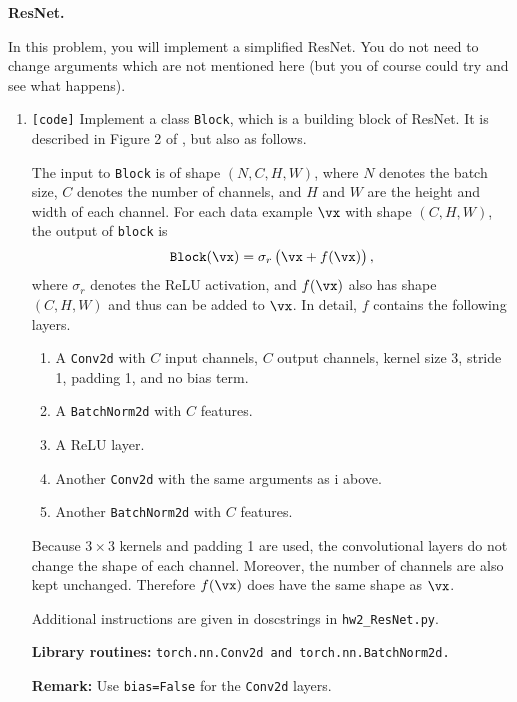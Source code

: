 \begin{Q}
    \textbf{\Large ResNet.}
    
    In this problem, you will implement a simplified ResNet. You do not need to change arguments which are not mentioned here (but you of course could try and see what happens).
    \begin{enumerate}
        \item \texttt{[code]} Implement a class \texttt{Block}, which is a building block of ResNet. It is described in Figure 2 of \citet{resnet}, but also as follows.

        The input to \texttt{Block} is of shape $(N,C,H,W)$, where $N$ denotes the batch size, $C$ denotes the number of channels, and $H$ and $W$ are the height and width of each channel. For each data example $\vx$ with shape $(C,H,W)$, the output of \texttt{block} is
        \begin{align*}%
            \texttt{Block}(\vx)=\sigma_r\del{\vx+f(\vx)},
        \end{align*}
        where $\sigma_r$ denotes the ReLU activation, and $f(\vx)$ also has shape $(C,H,W)$ and thus can be added to $\vx$. In detail, $f$ contains the following layers.
        \begin{enumerate}
            \item A \texttt{Conv2d} with $C$ input channels, $C$ output channels, kernel size 3, stride 1, padding 1, and no bias term.
            \item A \texttt{BatchNorm2d} with $C$ features.
            \item A ReLU layer.
            \item Another \texttt{Conv2d} with the same arguments as i above.
            \item Another \texttt{BatchNorm2d} with $C$ features.
        \end{enumerate}
        Because $3\times3$ kernels and padding 1 are used, the convolutional layers do not change the shape of each channel. Moreover, the number of channels are also kept unchanged. Therefore $f(\vx)$ does have the same shape as $\vx$.

        Additional instructions are given in doscstrings in \texttt{hw2\_ResNet.py}.
        
        \textbf{Library routines:} \texttt{torch.nn.Conv2d and torch.nn.BatchNorm2d.}
        
        \textbf{Remark:} Use \texttt{bias=False} for the \texttt{Conv2d} layers.


\end{enumerate}
\end{Q}
